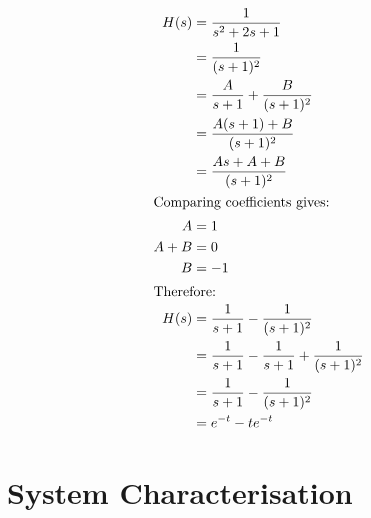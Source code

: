 \documentclass[oneside]{book}
\begin{document}
                \begin{align*}
                    H(s) &= \frac{1}{s^2 + 2s + 1}\\
                    &= \frac{1}{(s+1)^2}\\
                    &= \frac{A}{s+1} + \frac{B}{(s+1)^2}\\
                    &= \frac{A(s+1) + B}{(s+1)^2}\\
                    &= \frac{As + A + B}{(s+1)^2}\\
                    \intertext{Comparing coefficients gives:}
                    A &= 1\\
                    A + B &= 0\\
                    B &= -1\\
                    \intertext{Therefore:}
                    H(s) &= \frac{1}{s+1} - \frac{1}{(s+1)^2}\\
                    &= \frac{1}{s+1} - \frac{1}{s+1} + \frac{1}{(s+1)^2}\\
                    &= \frac{1}{s+1} - \frac{1}{(s+1)^2}\\
                    &= e^{-t} - te^{-t}
                \end{align*}
    \chapter{System Characterisation}
\end{document}
